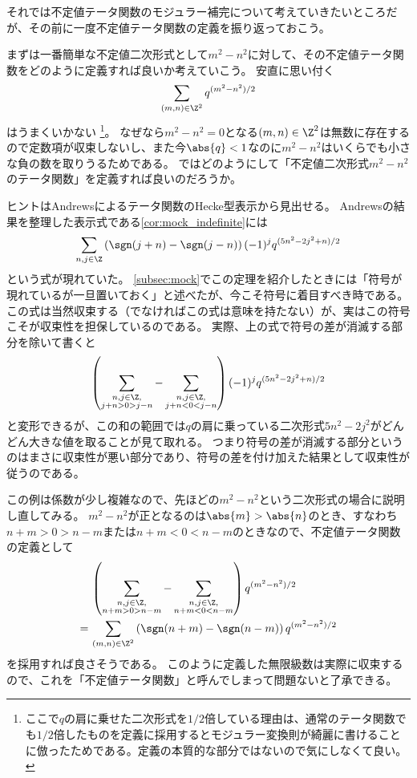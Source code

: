 \documentclass[11pt,b5paper,oneside,lualatex]{ltjsarticle} %
\numberwithin{equation}{section} %
\begin{document}

それでは不定値テータ関数のモジュラー補完について考えていきたいところだが、その前に一度不定値テータ関数の定義を振り返っておこう。

まずは一番簡単な不定値二次形式として$ m^2 - n^2 $に対して、その不定値テータ関数をどのように定義すれば良いか考えていこう。
安直に思い付く
\[
\sum_{(m, n) \in \Z^2} q^{(m^2 - n^2)/2}
\]
はうまくいかない%
\footnote{ここで$ q $の肩に乗せた二次形式を$ 1/2 $倍している理由は、通常のテータ関数でも$ 1/2 $倍したものを定義に採用するとモジュラー変換則が綺麗に書けることに倣ったためである。定義の本質的な部分ではないので気にしなくて良い。}。
なぜなら$ m^2 - n^2 = 0 $となる$ (m, n) \in \Z^2 $は無数に存在するので定数項が収束しないし、また今$ \abs{q} < 1 $なのに$ m^2 - n^2 $はいくらでも小さな負の数を取りうるためである。
ではどのようにして「不定値二次形式$ m^2 - n^2 $のテータ関数」を定義すれば良いのだろうか。

ヒントはAndrewsによるテータ関数のHecke型表示から見出せる。
Andrewsの結果を整理した表示式である\cref{cor:mock_indefinite}には
\[
\sum_{n, j \in \Z} \left( \sgn(j+n) - \sgn(j-n) \right) (-1)^j q^{(5n^2 - 2j^2 + n)/2}
\]
という式が現れていた。
\cref{subsec:mock}でこの定理を紹介したときには「符号が現れているが一旦置いておく」と述べたが、今こそ符号に着目すべき時である。
この式は当然収束する（でなければこの式は意味を持たない）が、実はこの符号こそが収束性を担保しているのである。
実際、上の式で符号の差が消滅する部分を除いて書くと
\[
\left( \sum_{\substack{n, j \in \Z, \\ j+n > 0 > j-n}} - \sum_{\substack{n, j \in \Z, \\ j+n < 0 < j-n}} \right) (-1)^j q^{(5n^2 - 2j^2 + n)/2}
\]
と変形できるが、この和の範囲では$ q $の肩に乗っている二次形式$ 5n^2 - 2j^2 $がどんどん大きな値を取ることが見て取れる。
つまり符号の差が消滅する部分というのはまさに収束性が悪い部分であり、符号の差を付け加えた結果として収束性が従うのである。

この例は係数が少し複雑なので、先ほどの$ m^2 - n^2 $という二次形式の場合に説明し直してみる。
$ m^2 - n^2 $が正となるのは$ \abs{m} > \abs{n} $のとき、すなわち$ n+m > 0 > n-m $または$ n+m < 0 < n-m $のときなので、不定値テータ関数の定義として
\begin{align}
	&\left( \sum_{\substack{n, j \in \Z, \\ n+m > 0 > n-m}} - \sum_{\substack{n, j \in \Z, \\ n+m < 0 < n-m}} \right) q^{(m^2 - n^2)/2}
	\\
	= \,
	&\sum_{(m, n) \in \Z^2} \left( \sgn(n+m) - \sgn(n-m) \right) q^{(m^2 - n^2)/2}
	\label{eq:indef_ex}
\end{align}
を採用すれば良さそうである。
このように定義した無限級数は実際に収束するので、これを「不定値テータ関数」と呼んでしまって問題ないと了承できる。
\end{document}
